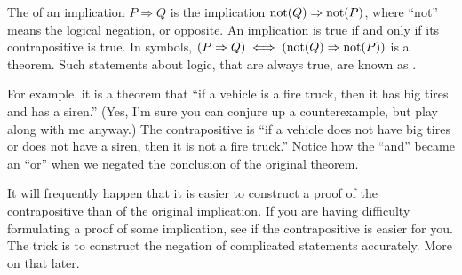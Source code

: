 The  of an implication $P\Rightarrow Q$ is the implication ${\rm not}(Q)\Rightarrow{\rm not}(P)$, where ``not'' means the logical negation, or opposite.  An implication is true if and only if its contrapositive is true.  In symbols, $(P\Rightarrow Q)\iff({\rm not}(Q)\Rightarrow{\rm not}(P))$ is a theorem.  Such statements about logic, that are always true, are known as .\par
%
For example, it is a theorem that ``if a vehicle is a fire truck, then it has big tires and has a siren.''  (Yes, I'm sure you can conjure up a counterexample, but play along with me anyway.)  The contrapositive is  ``if a vehicle does not have big tires or does not have a siren, then it is not a fire truck.''  Notice how the ``and'' became an ``or'' when we negated the conclusion of the original theorem.\par
%
It will frequently happen that it is easier to construct a proof of the contrapositive than of the original implication.  If you are having difficulty formulating a proof of some implication, see if the contrapositive is easier for you.  The trick is to construct the negation of complicated statements accurately.  More on that later.
